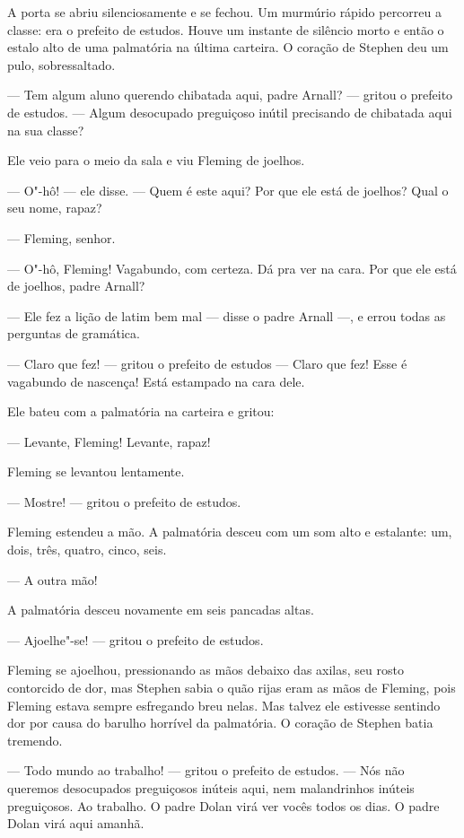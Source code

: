 A porta se abriu silenciosamente e se fechou. Um murmúrio rápido percorreu a
classe: era o prefeito de estudos. Houve um instante de silêncio morto
e então o estalo alto de uma palmatória na última carteira. O coração
de Stephen deu um pulo, sobressaltado.

 --- Tem algum aluno querendo chibatada aqui, padre Arnall? --- gritou o
prefeito de estudos. --- Algum desocupado preguiçoso inútil precisando de
chibatada aqui na sua classe?

Ele veio para o meio da sala e viu Fleming de joelhos.

 --- O"-hô! --- ele disse. --- Quem é este aqui? Por que ele está de joelhos? Qual o
seu nome, rapaz?

 --- Fleming, senhor.

 --- O"-hô, Fleming! Vagabundo, com certeza. Dá pra ver na cara. Por que ele
está de joelhos, padre Arnall?

 --- Ele fez a lição de latim bem mal --- disse o padre Arnall ---, e errou todas
as perguntas de gramática.

 --- Claro que fez! --- gritou o prefeito de estudos --- Claro que fez! Esse é
 vagabundo de nascença! Está estampado na cara dele.

Ele bateu com a palmatória na carteira e gritou:

 --- Levante, Fleming! Levante, rapaz!

Fleming se levantou lentamente.

 --- Mostre! --- gritou o prefeito de estudos.

Fleming estendeu a mão. A palmatória desceu com um som alto e estalante:
um, dois, três, quatro, cinco, seis.

 --- A outra mão!

A palmatória desceu novamente em seis pancadas altas.

 --- Ajoelhe"-se! --- gritou o prefeito de estudos.

Fleming se ajoelhou, pressionando as mãos debaixo das axilas, seu rosto
contorcido de dor, mas Stephen sabia o quão rijas eram as mãos de
Fleming, pois Fleming estava sempre esfregando breu nelas. Mas talvez
ele estivesse sentindo dor por causa do barulho horrível da palmatória.
O coração de Stephen batia tremendo.

 --- Todo mundo ao trabalho! --- gritou o prefeito de estudos. --- Nós não queremos
desocupados preguiçosos inúteis aqui, nem malandrinhos inúteis
preguiçosos. Ao trabalho. O padre Dolan virá ver vocês todos os
dias. O padre Dolan virá aqui amanhã.

